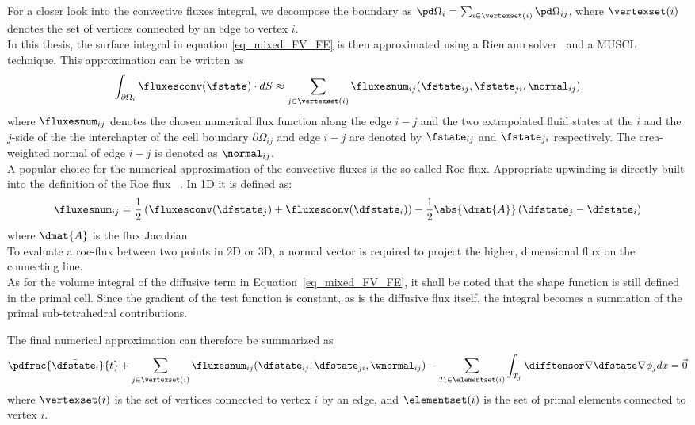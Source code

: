 \documentclass[../main.tex]{subfiles}
\begin{document}
For a closer look into the convective fluxes integral, we decompose the boundary as $\pd \Omega_i = \sum_{i \in \vertexset(i)} \pd\Omega_{ij}$, where $\vertexset(i)$ denotes the set of vertices connected by an edge to vertex $i$.\\
In this thesis, the surface integral in equation \eqref{eq_mixed_FV_FE} is then approximated using a Riemann solver~\cite{Roe1981} and a \ac{MUSCL} \cite{VanLeer1979} technique. This approximation can be written as
\begin{align}\label{eq:convectiveterm_approximation}
\int_{\partial\Omega_i} \fluxesconv(\fstate)\cdot dS \approx
\sum_{j \in \vertexset(i)} \fluxesnum_{ij}(\fstate_{ij},\fstate_{ji},\normal_{ij})
\end{align}
where $\fluxesnum_{ij}$ denotes the chosen numerical flux function along the edge $i-j$ and the two extrapolated fluid states at the $i$ and the $j$-side of the the interchapter of the cell boundary $\partial \Omega_{ij}$ and edge $i-j$ are denoted by $\fstate_{ij}$ and $\fstate_{ji}$ respectively. The area-weighted normal of edge $i-j$ is denoted as $\normal_{ij}$.
 \\
 A popular choice for the numerical approximation of the convective fluxes is the so-called Roe flux. Appropriate upwinding is directly built into the definition of the Roe flux ~\cite{Roe1981}. In 1D it is defined as:
 \begin{align}
\fluxesnum_{ij}=\frac{1}{2} \left(\fluxesconv(\dfstate_j)+\fluxesconv(\dfstate_i) \right)-\frac{1}{2}\abs{
\dmat{A}} \left( \dfstate_j-\dfstate_i \right)
 \end{align}
where $\dmat{A}$ is the flux Jacobian.
 \\
To evaluate a roe-flux between two points in 2D or 3D, a normal vector is required to project the higher, dimensional flux on the connecting line.
\\
As for the volume integral of the diffusive term in Equation~\eqref{eq_mixed_FV_FE}, it shall be noted that the shape function is still defined in the primal cell. Since the gradient of the test function is constant, as is the diffusive flux itself, the integral becomes a summation of the primal sub-tetrahedral contributions.


The final numerical approximation can therefore be summarized as
\begin{align}\label{eq:nse_final_discretized}
\pdfrac{\bar{\dfstate_i}}{t} +
\sum_{j \in \vertexset(i)} \fluxesnum_{ij}(\dfstate_{ij},\dfstate_{ji},\wnormal_{ij}) -
\sum_{T_i \in \elementset(i)} \int_{T_j} \difftensor \nabla \dfstate \nabla \phi_j dx =
\vec{0}
\end{align}
where $\vertexset(i)$ is the set of vertices connected to vertex $i$ by an edge, and $\elementset(i)$ is the set of primal elements connected to vertex $i$.
\end{document}
